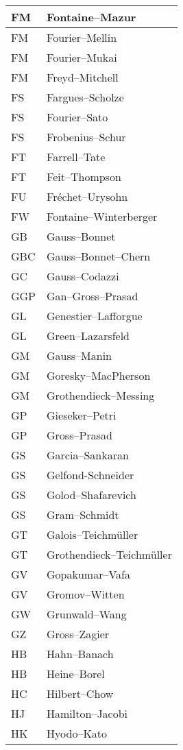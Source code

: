 \documentclass{amsart}
\numberwithin{equation}{section}
\theoremstyle{plain}
\numberwithin{equation}{section}
\theoremstyle{remark}
\begin{document}
\begin{multicols}{2}
{\begin{longtable}{l|l}
FM & Fontaine--Mazur\\ \hline
FM & Fourier--Mellin\\ \hline
FM & Fourier--Mukai\\ \hline
FM & Freyd--Mitchell\\ \hline
FS & Fargues--Scholze\\ \hline
FS & Fourier--Sato\\ \hline
FS & Frobenius--Schur\\ \hline
FT & Farrell--Tate\\ \hline
FT & Feit--Thompson\\ \hline
FU & Fréchet--Urysohn\\ \hline
FW & Fontaine--Winterberger\\ \hline
GB & Gauss--Bonnet\\ \hline
GBC & Gauss--Bonnet--Chern\\ \hline
GC & Gauss--Codazzi\\ \hline
GGP & Gan--Gross--Prasad\\ \hline
GL & Genestier--Lafforgue\\ \hline
GL & Green--Lazarsfeld\\ \hline
GM & Gauss--Manin\\ \hline
GM & Goresky--MacPherson\\ \hline
GM & Grothendieck--Messing\\ \hline
GP & Gieseker--Petri\\ \hline
GP & Gross--Prasad\\ \hline
GS & Garcia--Sankaran\\ \hline
GS & Gelfond-Schneider\\ \hline
GS & Golod--Shafarevich\\ \hline
GS & Gram--Schmidt\\ \hline
GT & Galois--Teichmüller\\ \hline
GT & Grothendieck--Teichmüller\\ \hline
GV & Gopakumar--Vafa\\ \hline
GV & Gromov--Witten\\ \hline
GW & Grunwald--Wang\\ \hline
GZ & Gross--Zagier\\ \hline
HB & Hahn--Banach\\ \hline
HB & Heine--Borel\\ \hline
HC & Hilbert--Chow\\ \hline
HJ & Hamilton--Jacobi\\ \hline
HK & Hyodo--Kato\\ \hline

\end{longtable}}
\end{multicols}
\end{document}
